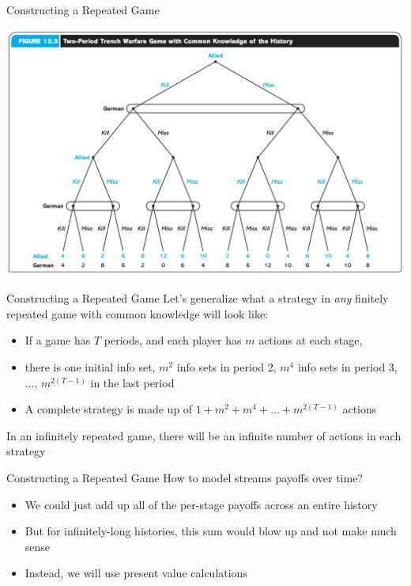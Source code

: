\begin{frame}{Constructing a Repeated Game}
  \begin{center}
    \includegraphics[width=1\textwidth]{figures/fig133.png} 
  \end{center} 
\end{frame}

\begin{frame}{Constructing a Repeated Game}
  Let's generalize what a strategy in \textit{any} \alert{finitely repeated game} with \alert{common knowledge} will look like:
  \begin{itemize}
    \item If a game has $T$ periods, and each player has $m$ actions at each stage,
    \item there is one initial info set, $m^2$ info sets in period 2, $m^4$ info sets in period 3, ..., $m^{2(T-1)}$ in the last period 
    \item A complete strategy is made up of $1 + m^2 + m^4 + ... + m^{2(T-1)}$ actions 
  \end{itemize}
  In an \alert{infinitely repeated game}, there will be an infinite number of actions in each strategy
\end{frame}

\begin{frame}{Constructing a Repeated Game}
  How to model streams payoffs over time?
  \begin{itemize}
    \item We could just add up all of the per-stage payoffs across an entire history
    \item But for infinitely-long histories, this sum would blow up and not make much sense
    \item Instead, we will use \alert{present value} calculations
  \end{itemize}
\end{frame}

